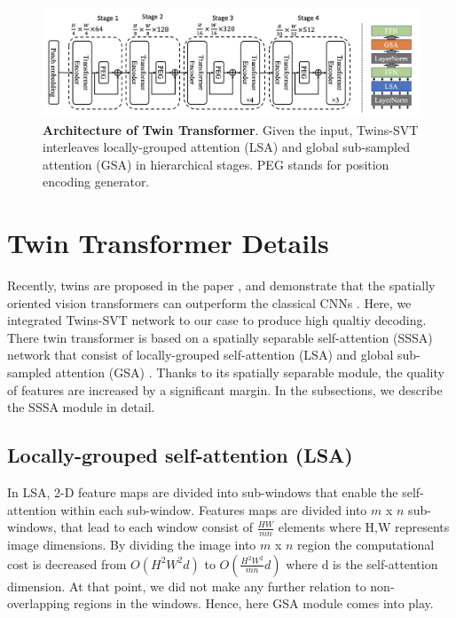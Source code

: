 \documentclass[10pt, twocolumn, letterpaper]{article}
\begin{document}
\begin{figure}
\centering
 \includegraphics[width=1\linewidth]{images/tt.png}
   \caption{\textbf{Architecture of Twin Transformer}. Given the input, Twins-SVT interleaves locally-grouped attention (LSA) and global sub-sampled attention (GSA) in hierarchical stages. PEG stands for position encoding generator.}
\label{fig:twins}
\end{figure}

\section{Twin Transformer Details}
\label{appendix:E}
Recently, twins are proposed in the paper \cite{chu2021twins}, and demonstrate that the spatially oriented vision transformers can outperform the classical CNNs \cite{chu2021twins}. Here, we integrated Twins-SVT network to our case to produce high qualtiy decoding. There twin transformer is based on a spatially separable self-attention (SSSA) network that consist of locally-grouped self-attention (LSA) and global sub-sampled attention (GSA) \cite{chu2021twins}. Thanks to its spatially separable module, the quality of features are increased by a significant margin. In the subsections, we describe the SSSA module in detail.  



\subsection{Locally-grouped self-attention (LSA)}
In LSA, 2-D feature maps are divided into sub-windows that enable the self-attention within each sub-window. Features maps are divided into $m$ x $n$ sub-windows, that lead to each window consist of $\frac{HW}{mn}$ elements where H,W represents image dimensions. By dividing the image into $m$ x $n$ region the computational cost is decreased from $ O(H^2W^2d)$ to $O(\frac{H^2W^2}{mn}d)$ where d is the self-attention dimension. At that point, we did not make any further relation to non-overlapping regions in the windows. Hence, here GSA module comes into play.
\end{document}
